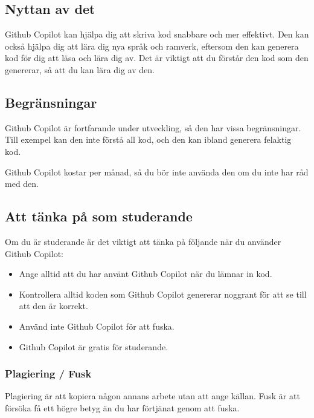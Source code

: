 \hypertarget{nyttan-av-det}{%
\subsection{Nyttan av det}\label{nyttan-av-det}}

Github Copilot kan hjälpa dig att skriva kod snabbare och mer effektivt.
Den kan också hjälpa dig att lära dig nya språk och ramverk, eftersom
den kan generera kod för dig att läsa och lära dig av. Det är viktigt
att du förstår den kod som den genererar, så att du kan lära dig av den.

\hypertarget{begruxe4nsningar}{%
\subsection{Begränsningar}\label{begruxe4nsningar}}

Github Copilot är fortfarande under utveckling, så den har vissa
begränsningar. Till exempel kan den inte förstå all kod, och den kan
ibland generera felaktig kod.

Github Copilot kostar per månad, så du bör inte använda den om du inte
har råd med den.

\hypertarget{att-tuxe4nka-puxe5-som-studerande}{%
\subsection{Att tänka på som
studerande}\label{att-tuxe4nka-puxe5-som-studerande}}

Om du är studerande är det viktigt att tänka på följande när du använder
Github Copilot:

\begin{itemize}
\tightlist
\item
  Ange alltid att du har använt Github Copilot när du lämnar in kod.
\item
  Kontrollera alltid koden som Github Copilot genererar noggrant för att
  se till att den är korrekt.
\item
  Använd inte Github Copilot för att fuska.
\item
  Github Copilot är gratis för studerande.
\end{itemize}

\hypertarget{plagiering-fusk}{%
\subsubsection{Plagiering / Fusk}\label{plagiering-fusk}}

Plagiering är att kopiera någon annans arbete utan att ange källan. Fusk
är att försöka få ett högre betyg än du har förtjänat genom att fuska.

